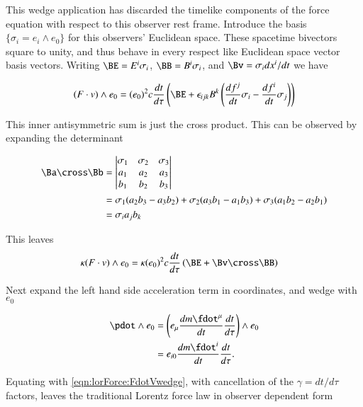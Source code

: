 This wedge application has discarded the timelike components of the force equation with respect to this observer rest frame.
Introduce the basis
$\{\sigma_i = e_i \wedge e_0\}$ for this observers' Euclidean space.  These spacetime bivectors square to unity, and thus behave in every respect like
Euclidean space vector basis vectors.  Writing $\BE = E^i \sigma_i$, $\BB = B^i \sigma_i$, and $\Bv = \sigma_i dx^i/dt$ we have

\begin{align*}
(F \cdot v) \wedge e_0
&= (e_0)^2 c \frac{dt}{d\tau} \left( \BE + \epsilon_{ijk} B^k \left( \frac{df^j}{dt} \sigma_{i} - \frac{df^i}{dt} \sigma_{j} \right) \right) \\
\end{align*}

This inner antisymmetric sum is just the cross product.  This can be observed by expanding the determinant

\begin{align*}
\Ba \cross \Bb &= 
\begin{vmatrix}
\sigma_1 & \sigma_2 & \sigma_3 \\
a_1 & a_2 & a_3 \\
b_1 & b_2 & b_3 \\
\end{vmatrix} \\
&=
  \sigma_1 (a_2 b_3 - a_3 b_2)
+ \sigma_2 (a_3 b_1 - a_1 b_3)
+ \sigma_3 (a_1 b_2 - a_2 b_1) \\
&=
  \sigma_i a_j b_k
\end{align*}

This leaves
\begin{align}\label{eqn:lorForce:FdotVwedge}
\kappa (F \cdot v) \wedge e_0
&= \kappa (e_0)^2 c \frac{dt}{d\tau} \left( \BE + \Bv \cross \BB \right)
\end{align}

Next expand the left hand side acceleration term in coordinates, and wedge with $e_0$

\begin{align*}
\pdot \wedge e_0 
&= \left(e_\mu \frac{d m \fdot^\mu}{dt}\frac{dt}{d\tau} \right) \wedge e_0 \\
&= e_{i0} \frac{d m \fdot^i}{dt} \frac{dt}{d\tau}.
\end{align*}

Equating with \ref{eqn:lorForce:FdotVwedge}, with cancellation of the $\gamma = dt/d\tau$ factors, leaves the traditional Lorentz force law in observer dependent form


